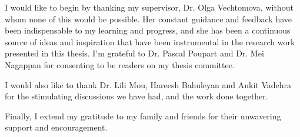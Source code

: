 I would like to begin by thanking my supervisor, Dr. Olga Vechtomova, without whom none of this would be possible. Her constant guidance and feedback have been indispensable to my learning and progress, and she has been a continuous source of ideas and inspiration that have been instrumental in the research work presented in this thesis. I'm grateful to Dr. Pascal Poupart and Dr. Mei Nagappan for consenting to be readers on my thesis committee.

I would also like to thank Dr. Lili Mou, Hareesh Bahuleyan and Ankit Vadehra for the stimulating discussions we have had, and the work done together.

Finally, I extend my gratitude to my family and friends for their unwavering support and encouragement.
